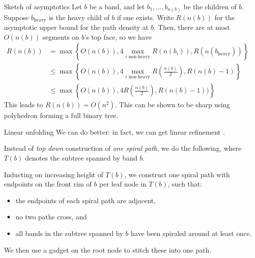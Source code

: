 \documentclass{beamer}
\theoremstyle{plain}
\begin{document}
\begin{frame}{Sketch of asymptotics}
  Let $b$ be a band, and let $b_1,\dots,b_{n(b)}$ be the children of $b$.
  Suppose $b_{\text{heavy}}$ is the heavy child of $b$ if one exists.
  Write $R(n(b))$ for the asymptotic upper bound for the path density at $b$.
  Then, there are at most $O(n(b))$ segments on $b$'s top face, so we have
  \begin{align*}
    R(n(b)) 
    &= \max \left\{ O(n(b)), 4 \max_{i \text{ non-heavy}} R(n(b_i)), R(n(b_{\text{heavy}}))\right\}\\
    &\leq \max \left\{ O(n(b)), 4 \max_{i \text{ non-heavy}} R\left( \frac{n(b)}{2} \right), R(n(b) - 1)\right\}\\
    &\leq \max \left\{ O(n(b)), 4 R\left( \frac{n(b)}{2} \right), R(n(b) - 1))\right\}
  \end{align*}
  This leads to $R(n(b)) = O(n^2)$.
  This can be shown to be sharp using polyhedron forming a full binary tree.
\end{frame}
  
\begin{frame}{Linear unfolding}
  We can do better:
  in fact, we can get linear refinement .

  Instead of \emph{top down} construction of \emph{one spiral path}, we do the following, where $T(b)$ denotes the subtree spanned by band $b$.

  Inducting on increasing height of $T(b)$, we construct one spiral path with endpoints on the front rim of $b$ per leaf node in $T(b)$, such that:
    \begin{itemize}
      \item the endpoints of each spiral path are adjacent,
      \item no two paths cross, and
      \item all bands in the subtree spanned by $b$ have been spiraled around at least once.
    \end{itemize}
  We then use a gadget on the root node to stitch these into one path.
\end{frame}
\end{document}
